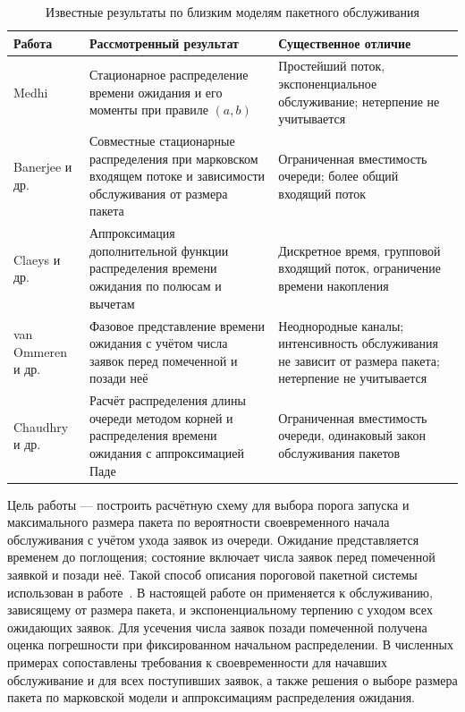 \begin{table}[htbp]
\centering\small
\caption{Известные результаты по близким моделям пакетного обслуживания}\label{tab:prior}
\begin{tabular}{p{.22\linewidth}p{.36\linewidth}p{.34\linewidth}}
\hline
Работа & Рассмотренный результат & Существенное отличие \\\hline
Medhi~\cite{medhi1975} & Стационарное распределение времени ожидания и его моменты при правиле $(a,b)$ & Простейший поток, экспоненциальное обслуживание; нетерпение не учитывается \\
Banerjee и др.~\cite{banerjee2015} & Совместные стационарные распределения при марковском входящем потоке и зависимости обслуживания от размера пакета & Ограниченная вместимость очереди; более общий входящий поток \\
Claeys и др.~\cite{claeys2013} & Аппроксимация дополнительной функции распределения времени ожидания по полюсам и вычетам & Дискретное время, групповой входящий поток, ограничение времени накопления \\
van Ommeren и др.~\cite{vanommer2020} & Фазовое представление времени ожидания с учётом числа заявок перед помеченной и позади неё & Неоднородные каналы; интенсивность обслуживания не зависит от размера пакета; нетерпение не учитывается \\
Chaudhry и др.~\cite{chaudhry2023} & Расчёт распределения длины очереди методом корней и распределения времени ожидания с аппроксимацией Паде & Ограниченная вместимость очереди, одинаковый закон обслуживания пакетов \\
\hline
\end{tabular}
\end{table}

Цель работы --- построить расчётную схему для выбора порога запуска и максимального размера пакета по вероятности своевременного начала обслуживания с учётом ухода заявок из очереди. Ожидание представляется временем до поглощения; состояние включает числа заявок перед помеченной заявкой и позади неё. Такой способ описания пороговой пакетной системы использован в работе~\cite{vanommer2020}. В настоящей работе он применяется к обслуживанию, зависящему от размера пакета, и экспоненциальному терпению с уходом всех ожидающих заявок. Для усечения числа заявок позади помеченной получена оценка погрешности при фиксированном начальном распределении. В численных примерах сопоставлены требования к своевременности для начавших обслуживание и для всех поступивших заявок, а также решения о выборе размера пакета по марковской модели и аппроксимациям распределения ожидания.

